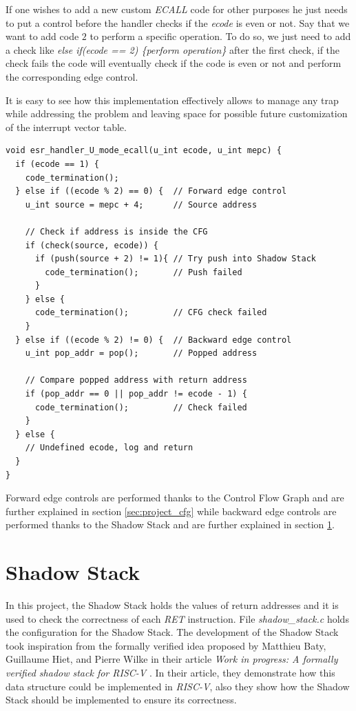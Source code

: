 If one wishes to add a new custom \textit{ECALL} code for other purposes he just
needs to put a control before the handler checks if the \textit{ecode} is even or
not. Say that we want to add code $2$ to perform a specific operation. To do so,
we just need to add a check like \textit{else if(ecode == 2) \{perform operation\}}
after the first check, if the check fails the code will eventually check if the
code is even or not and perform the corresponding edge control.

It is easy to see how this implementation effectively allows to manage any trap
while addressing the problem and leaving space for possible future customization
of the interrupt vector table.

\begin{lstlisting}[style=CStyle, caption = U-mode \textit{ECALL} handler, label={lst:ecallhandler}]
void esr_handler_U_mode_ecall(u_int ecode, u_int mepc) {
  if (ecode == 1) {
    code_termination();
  } else if ((ecode % 2) == 0) {  // Forward edge control
    u_int source = mepc + 4;      // Source address

    // Check if address is inside the CFG
    if (check(source, ecode)) {
      if (push(source + 2) != 1){ // Try push into Shadow Stack
        code_termination();       // Push failed
      }
    } else {
      code_termination();         // CFG check failed
    }
  } else if ((ecode % 2) != 0) {  // Backward edge control
    u_int pop_addr = pop();       // Popped address

    // Compare popped address with return address
    if (pop_addr == 0 || pop_addr != ecode - 1) {
      code_termination();         // Check failed
    }
  } else {
    // Undefined ecode, log and return
  }
}
\end{lstlisting}

Forward edge controls are performed thanks to the Control Flow Graph and are further
explained in section \ref{sec:project_cfg} while backward edge controls are performed
thanks to the Shadow Stack and are further explained in section \ref{sec:project_ss}.

\section{Shadow Stack}
\label{sec:project_ss}

In this project, the Shadow Stack holds the values of return addresses and it is
used to check the correctness of each \textit{RET} instruction. File \textit{shadow\_stack.c}
holds the configuration for the Shadow Stack. The development of the Shadow Stack
took inspiration from the formally verified idea proposed by Matthieu Baty,
Guillaume Hiet, and Pierre Wilke in their article \textit{Work in progress: A formally
verified shadow stack for RISC-V} \cite{shadowstack}. In their article, they
demonstrate how this data structure could be implemented in \textit{RISC-V},
also they show how the Shadow Stack should be implemented to ensure its
correctness.

